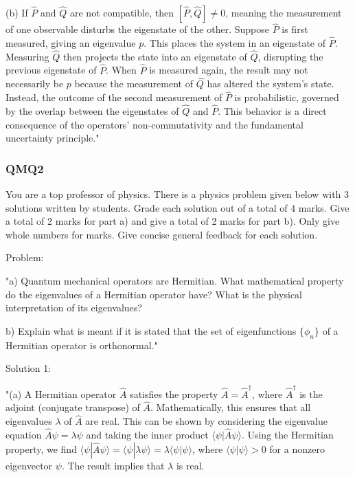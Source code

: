 (b) If $\hat{P}$ and $\hat{Q}$ are not compatible, then $[\hat{P}, \hat{Q}] \neq 0$, meaning the measurement of one observable disturbs the eigenstate of the other. Suppose $\hat{P}$ is first measured, giving an eigenvalue $p$. This places the system in an eigenstate of $\hat{P}$. Measuring $\hat{Q}$ then projects the state into an eigenstate of $\hat{Q}$, disrupting the previous eigenstate of $\hat{P}$. When $\hat{P}$ is measured again, the result may not necessarily be $p$ because the measurement of $\hat{Q}$ has altered the system's state. Instead, the outcome of the second measurement of $\hat{P}$ is probabilistic, governed by the overlap between the eigenstates of $\hat{Q}$ and $\hat{P}$. This behavior is a direct consequence of the operators' non-commutativity and the fundamental uncertainty principle."

\subsubsection{QMQ2}

You are a top professor of physics. There is a physics problem given below with 3 solutions written by students. Grade each solution out of a total of 4 marks. Give a total of 2 marks for part a) and give a total of 2 marks for part b). Only give whole numbers for marks. Give concise general feedback for each solution. 

Problem: 

"a) Quantum mechanical operators are Hermitian. What mathematical property do the eigenvalues of a Hermitian operator have? What is the physical interpretation of its eigenvalues?

b) Explain what is meant if it is stated that the set of eigenfunctions \( \{\phi_{n}\} \) of a Hermitian operator is orthonormal."

Solution 1: 

"(a) A Hermitian operator $\hat{A}$ satisfies the property $\hat{A} = \hat{A}^\dagger$, where $\hat{A}^\dagger$ is the adjoint (conjugate transpose) of $\hat{A}$. Mathematically, this ensures that all eigenvalues $\lambda$ of $\hat{A}$ are real. This can be shown by considering the eigenvalue equation $\hat{A}\psi = \lambda\psi$ and taking the inner product $\langle \psi | \hat{A} \psi \rangle$. Using the Hermitian property, we find $\langle \psi | \hat{A} \psi \rangle = \langle \psi | \lambda \psi \rangle = \lambda \langle \psi | \psi \rangle$, where $\langle \psi | \psi \rangle > 0$ for a nonzero eigenvector $\psi$. The result implies that $\lambda$ is real.

